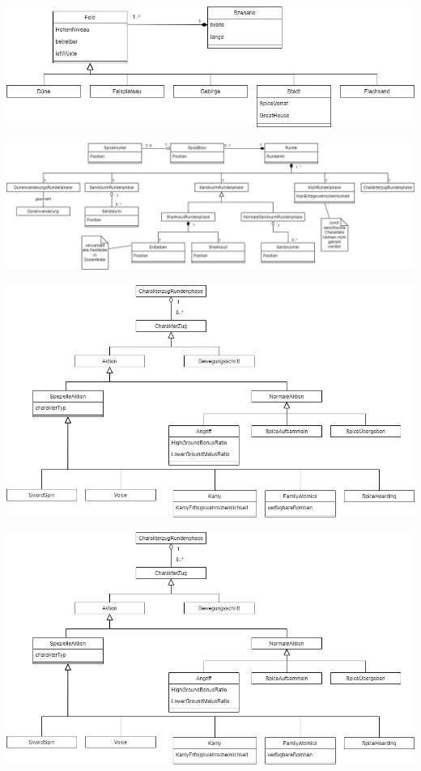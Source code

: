 \documentclass[12pt]{article}
\begin{document}
\vspace{2cm}
\includegraphics[width=\textwidth]{images/DMSzenario}
\label{fig:dmszenario}

\vspace{2cm}
\includegraphics[width=\textwidth]{images/DMRunde}
\label{fig:dmrunde}

\vspace{2cm}

\includegraphics[width=\textwidth]{images/DMCharakterzug}
\label{fig:dmcharakterzug}

\vspace{2cm}
\includegraphics[width=\textwidth]{images/DMCharakterzug}
\label{fig:dmcharakterzug}
\end{document}
